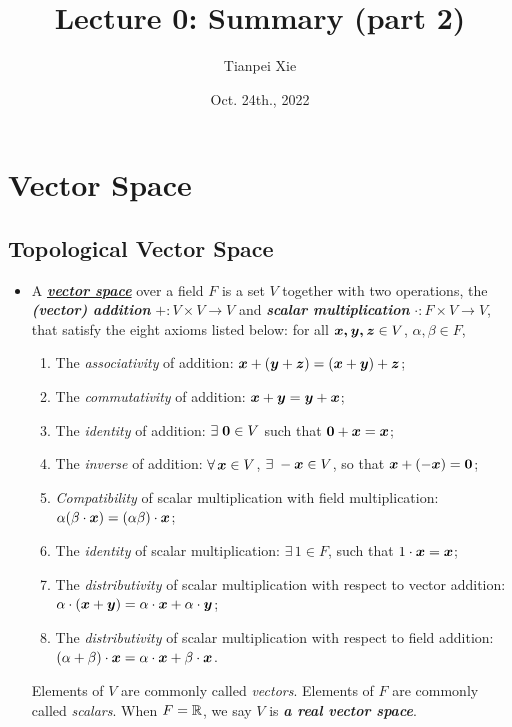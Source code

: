 \documentclass[11pt]{article}
\begin{document}
\title{Lecture 0: Summary (part 2)}
\author{ Tianpei Xie}
\date{Oct. 24th., 2022}
\maketitle
\tableofcontents
\newpage
\section{Vector Space}
\subsection{Topological Vector Space}
\begin{itemize}
\item
\begin{definition} 
A \underline{\emph{\textbf{vector space}}} over a field $F$ is a set $V$ together with two operations,  the \emph{\textbf{(vector) addition}} $+: V\times V \rightarrow V$ and \emph{\textbf{scalar multiplication}} $\cdot: F \times V \rightarrow V$, that satisfy the eight axioms listed below:
for all $\boldsymbol{x, y, z}\in V$, $\alpha, \beta\in F$, 
\begin{enumerate}
\item The \emph{associativity} of addition: $\boldsymbol{x}+ (\boldsymbol{y}+ \boldsymbol{z}) = (\boldsymbol{x}+ \boldsymbol{y})+ \boldsymbol{z}$;
\item The \emph{commutativity} of addition:  $\boldsymbol{x}+ \boldsymbol{y} = \boldsymbol{y}+ \boldsymbol{x}$;
\item The \emph{identity} of addition: $\exists\;\boldsymbol{0}\in V$	 such that $\boldsymbol{0}+ \boldsymbol{x} = \boldsymbol{x}$;
\item The \emph{inverse} of addition: $\forall\, \boldsymbol{x}\in V$, $\exists\;-\boldsymbol{x}\in V$, so that $\boldsymbol{x}+ (- \boldsymbol{x}) = \boldsymbol{0}$;
\item \emph{Compatibility} of scalar multiplication with field multiplication: $\alpha(\beta \cdot\boldsymbol{x}) = (\alpha\beta)\cdot\boldsymbol{x}$;
\item The \emph{identity} of scalar multiplication: $\exists\, 1\in F$, such that $1\cdot \boldsymbol{x} = \boldsymbol{x}$;
\item The \emph{distributivity} of scalar multiplication with respect to vector addition: $\alpha\cdot (\boldsymbol{x}+\boldsymbol{y})= \alpha\cdot \boldsymbol{x}+ \alpha\cdot \boldsymbol{y}$;
\item The \emph{distributivity} of scalar multiplication with respect to field addition: $(\alpha+ \beta)\cdot \boldsymbol{x} = \alpha\cdot \boldsymbol{x}+ \beta\cdot\boldsymbol{x}$.	
\end{enumerate}
Elements of $V$ are commonly called \emph{vectors}. Elements of $F$ are commonly called \emph{scalars}. When $F = {\mathbb R}$, we say $V$ is \emph{\textbf{a real vector space}}.
\end{definition}


\end{itemize}
\end{document}

